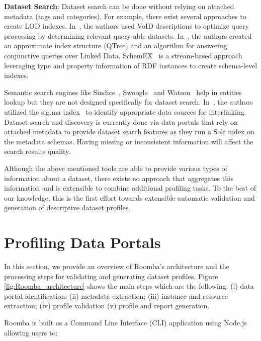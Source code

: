 \textbf{Dataset Search}: Dataset search can be done without relying on attached metadata (tags and categories). For example, there exist several approaches to create LOD indexes. In~\cite{Alexander:LDOW:09}, the authors used VoID descriptions to optimize query processing by determining relevant query-able datasets. In~\cite{Harth:WWW:10}, the authors created an approximate index structure (QTree) and an algorithm for answering conjunctive queries over Linked Data. SchemEX~\cite{Konrath:WebSemJorunal:12} is a stream-based approach leveraging type and property information of RDF instances to create schema-level indexes.

Semantic search engines like Sindice~\cite{Delbru:ESWC:10}, Swoogle~\cite{Ding:CIKM:04} and Watson~\cite{daquin:SemWebJorunal:11} help in entities lookup but they are not designed specifically for dataset search. In~\cite{Nikolov:JIST:11}, the authors utilized the sig.ma index~\cite{Tummarello:WebSemJorunal:10} to identify appropriate data sources for interlinking. Dataset search and discovery is currently done via data portals that rely on attached metadata to provide dataset search features as they run a Solr index on the metadata schemas. Having missing or inconsistent information will affect the search results quality.

Although the above mentioned tools are able to provide various types of information about a dataset, there exists no approach that aggregates this information and is extensible to combine additional profiling tasks. To the best of our knowledge, this is the first effort towards extensible automatic validation and generation of descriptive dataset profiles.


\section{Profiling Data Portals}
\label{section:roomba-framework}
In this section, we provide an overview of Roomba's architecture and the processing steps for validating and generating dataset profiles. Figure \ref{fig:Roomba_architecture} shows the main steps which are the following: (i) data portal identification; (ii) metadata extraction; (iii) instance and resource extraction; (iv) profile validation (v) profile and report generation.

Roomba is built as a Command Line Interface (CLI) application using Node.js allowing users to:

